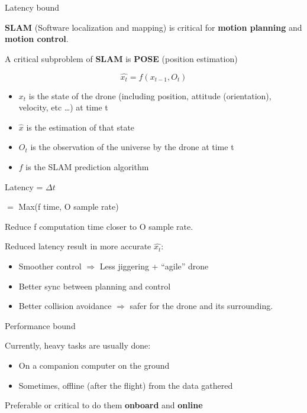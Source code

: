 \begin{frame}{Latency bound}

\textbf{SLAM} (Software localization and mapping) is critical for
\textbf{motion planning} and \textbf{motion control}.

A critical subproblem of \textbf{SLAM} is \textbf{POSE} (position
estimation)

\end{frame}

\begin{frame}{}

\[\hat{x_t} = f(x_{t-1}, O_t)\]

\begin{itemize}
\tightlist
\item
  \(x_t\) is the state of the drone (including position, attitude
  (orientation), velocity, etc \ldots{}) at time t
\item
  \(\hat{x}\) is the estimation of that state
\item
  \(O_t\) is the observation of the universe by the drone at time t
\item
  \(f\) is the SLAM prediction algorithm
\end{itemize}

\end{frame}

\begin{frame}{}

Latency = \(\Delta t\)

\(=\) Max(f time, O sample rate)

Reduce f computation time closer to O sample rate.

\end{frame}

\begin{frame}{}

Reduced latency result in more accurate \(\hat{x_t}\):

\begin{itemize}
\tightlist
\item
  Smoother control \(\Rightarrow\) Less jiggering + ``agile'' drone
\item
  Better sync between planning and control
\item
  Better collision avoidance \(\Rightarrow\) safer for the drone and its
  surrounding.
\end{itemize}

\end{frame}

\begin{frame}{Performance bound}

Currently, heavy tasks are usually done:

\begin{itemize}
\tightlist
\item
  On a companion computer on the ground
\item
  Sometimes, offline (after the flight) from the data gathered
\end{itemize}

Preferable or critical to do them \textbf{onboard} and \textbf{online}

\end{frame}

